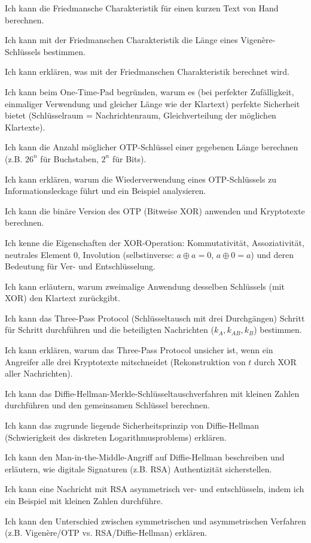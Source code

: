 \begin{todolist}
  \item Ich kann die Friedmansche Charakteristik für einen kurzen Text von Hand berechnen.
  \item Ich kann mit der Friedmanschen Charakteristik die Länge eines Vigenère-Schlüssels bestimmen.
  \item Ich kann erklären, was mit der Friedmanschen Charakteristik berechnet wird.
  \item Ich kann beim One-Time-Pad begründen, warum es (bei perfekter Zufälligkeit, einmaliger Verwendung und gleicher Länge wie der Klartext) perfekte Sicherheit bietet (Schlüsselraum = Nachrichtenraum, Gleichverteilung der möglichen Klartexte).
  \item Ich kann die Anzahl möglicher OTP-Schlüssel einer gegebenen Länge berechnen (z.B. $26^n$ für Buchstaben, $2^n$ für Bits).
  \item Ich kann erklären, warum die Wiederverwendung eines OTP-Schlüssels zu Informationsleckage führt und ein Beispiel analysieren.
  \item Ich kann die binäre Version des OTP (Bitweise XOR) anwenden und Kryptotexte berechnen.
  \item Ich kenne die Eigenschaften der XOR-Operation: Kommutativität, Assoziativität, neutrales Element 0, Involution (selbstinverse: $a\oplus a = 0$, $a\oplus 0 = a$) und deren Bedeutung für Ver- und Entschlüsselung.
  \item Ich kann erläutern, warum zweimalige Anwendung desselben Schlüssels (mit XOR) den Klartext zurückgibt.
  \item Ich kann das Three-Pass Protocol (Schlüsseltausch mit drei Durchgängen) Schritt für Schritt durchführen und die beteiligten Nachrichten ($k_A, k_{AB}, k_B$) bestimmen.
  \item Ich kann erklären, warum das Three-Pass Protocol unsicher ist, wenn ein Angreifer alle drei Kryptotexte mitschneidet (Rekonstruktion von $t$ durch XOR aller Nachrichten).
  \item Ich kann das Diffie-Hellman-Merkle-Schlüsseltauschverfahren mit kleinen Zahlen durchführen und den gemeinsamen Schlüssel berechnen.
  \item Ich kann das zugrunde liegende Sicherheitsprinzip von Diffie-Hellman (Schwierigkeit des diskreten Logarithmusproblems) erklären.
  \item Ich kann den Man-in-the-Middle-Angriff auf Diffie-Hellman beschreiben und erläutern, wie digitale Signaturen (z.B. RSA) Authentizität sicherstellen.
  \item Ich kann eine Nachricht mit RSA asymmetrisch ver- und entschlüsseln, indem ich ein Beispiel mit kleinen Zahlen durchführe.
  \item Ich kann den Unterschied zwischen symmetrischen und asymmetrischen Verfahren (z.B. Vigenère/OTP vs. RSA/Diffie-Hellman) erklären.
\end{todolist}
